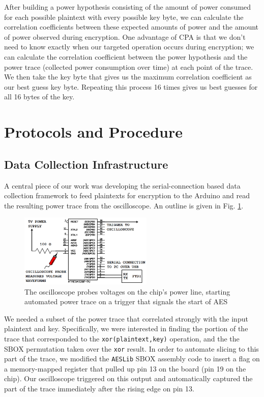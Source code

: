 \documentclass[journal]{ieee_style}
\begin{document}
After building a power hypothesis consisting of the amount of power consumed for each possible plaintext with every possible key byte, we can calculate the correlation coefficients between these expected amounts of power and the amount of power observed during encryption. One advantage of CPA is that we don't need to know exactly when our targeted operation occurs during encryption; we can calculate the correlation coefficient between the power hypothesis and the power trace (collected power consumption over time) at each point of the trace. We then take the key byte that gives us the maximum correlation coefficient as our best guess key byte. Repeating this process 16 times gives us best guesses for all 16 bytes of the key.


\section{Protocols and Procedure}
\subsection{Data Collection Infrastructure}
A central piece of our work was developing the serial-connection based data collection framework to feed plaintexts for encryption to the Arduino and read the resulting power trace from the oscilloscope. An outline is given in Fig. \ref{fig_sim}.

\begin{figure}[!t]
\centering
\includegraphics[width=2.5in]{setup}
\caption{The oscilloscope probes voltages on the chip's power line, starting automated power trace on a trigger that signals the start of AES}
\label{fig_sim}
\end{figure}

We needed a subset of the power trace that correlated strongly with the input plaintext and key. Specifically, we were interested in finding the portion of the trace that corresponded to the \texttt{xor(plaintext,key)} operation, and the the SBOX permutation taken over the \texttt{xor} result. In order to automate slicing to this part of the trace, we modified the \texttt{AESLib} SBOX assembly code to insert a flag on a memory-mapped register that pulled up pin 13 on the board (pin 19 on the chip). Our oscilloscope triggered on this output and automatically captured the part of the trace immediately after the rising edge on pin 13.
\end{document}
